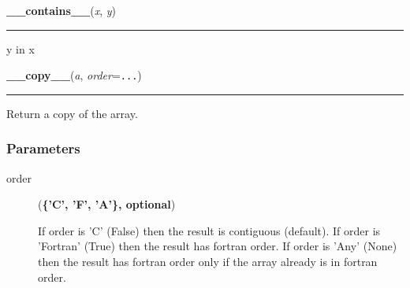     \label{numpy:ndarray:__contains__}

    \vspace{0.5ex}

    \begin{boxedminipage}{\textwidth}

    \raggedright \textbf{\_\_contains\_\_}(\textit{x}, \textit{y})

    \vspace{-1.5ex}

    \rule{\textwidth}{0.5\fboxrule}

y in x
    \vspace{1ex}

    \end{boxedminipage}

    \label{numpy:ndarray:__copy__}

    \vspace{0.5ex}

    \begin{boxedminipage}{\textwidth}

    \raggedright \textbf{\_\_copy\_\_}(\textit{a}, \textit{order}=\texttt{...})

    \vspace{-1.5ex}

    \rule{\textwidth}{0.5\fboxrule}

Return a copy of the array.



\hypertarget{parameters}{}
\subsubsection*{Parameters}
\begin{description}
\item[{order}] (\textbf{{\{}'C', 'F', 'A'{\}}, optional})

If order is 'C' (False) then the result is contiguous (default).
If order is 'Fortran' (True) then the result has fortran order.
If order is 'Any' (None) then the result has fortran order
only if the array already is in fortran order.

\end{description}
    \vspace{1ex}

    \end{boxedminipage}

